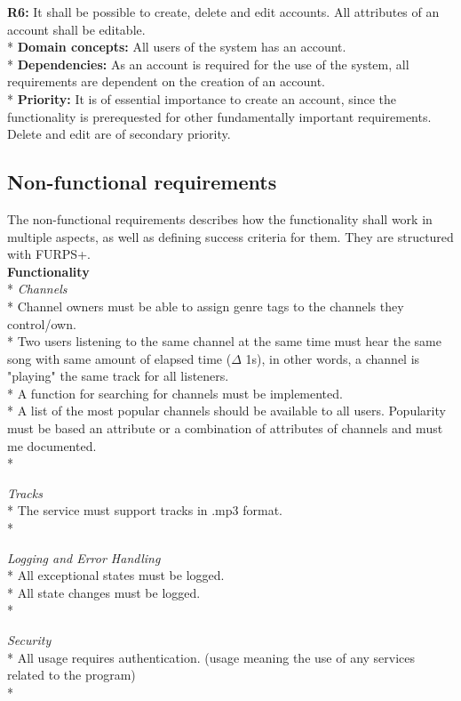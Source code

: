 \documentclass[a4paper,11pt,report]{article}
\begin{document}
\textbf{R6:}
It shall be possible to create, delete and edit accounts. All attributes of an account shall be editable. \\*
\textbf{Domain concepts:}
All users of the system has an account. \\*
\textbf{Dependencies:}
As an account is required for the use of the system, all requirements are dependent on the creation of an account. \\*
\textbf{Priority:} 
It is of essential importance to create an account, since the functionality is prerequested for other fundamentally important requirements. Delete and edit are of secondary priority.

\subsection{Non-functional requirements}
The non-functional requirements describes how the functionality shall work in multiple aspects, as well as defining success criteria for them. They are structured with FURPS+. \\

\textbf{Functionality} \\*
\textit{Channels} \\*
Channel owners must be able to assign genre tags to the channels they control/own. \\*
Two users listening to the same channel at the same time must hear the same song with same amount of elapsed time (\(\Delta\) 1s), in other words, a channel is "playing" the same track for all listeners. \\*
A function for searching for channels must be implemented. \\*
A list of the most popular channels should be available to all users. Popularity must be based an attribute or a combination of attributes of channels and must me documented. \\*

\textit{Tracks} \\*
The service must support tracks in .mp3 format. \\*

\textit{Logging and Error Handling} \\*
All exceptional states must be logged.\\*
All state changes must be logged.\\*

\textit{Security} \\*
All usage requires authentication. (usage meaning the use of any services related to the program)\\*
\end{document}
